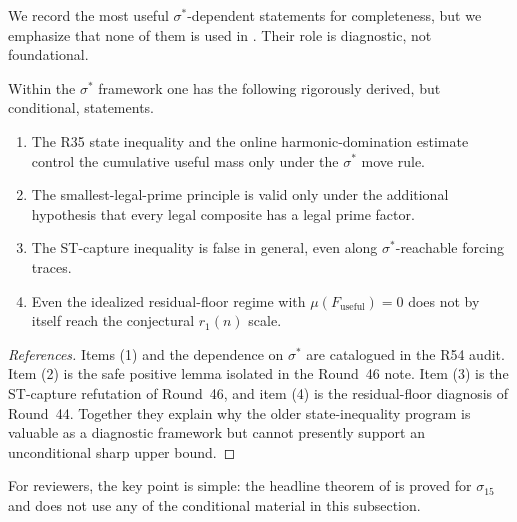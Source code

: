 We record the most useful $\sigma^*$-dependent statements for completeness, but
we emphasize that none of them is used in .  Their
role is diagnostic, not foundational.

\begin{proposition}\label{prop:sigma-star-conditional}
Within the $\sigma^*$ framework one has the following rigorously derived, but
conditional, statements.
\begin{enumerate}
  \item The R35 state inequality and the online harmonic-domination estimate
  control the cumulative useful mass only under the $\sigma^*$ move rule.
  \item The smallest-legal-prime principle is valid only under the additional
  hypothesis that every legal composite has a legal prime factor.
  \item The ST-capture inequality is false in general, even along
  $\sigma^*$-reachable forcing traces.
  \item Even the idealized residual-floor regime with $\mu(F_{\mathrm{useful}})
  =0$ does not by itself reach the conjectural $r_1(n)$ scale.
\end{enumerate}
\end{proposition}

\begin{proof}[References]
Items (1) and the dependence on $\sigma^*$ are catalogued in the R54 audit.
Item (2) is the safe positive lemma isolated in the Round~46 note.  Item (3) is
the ST-capture refutation of Round~46, and item (4) is the residual-floor
diagnosis of Round~44.  Together they explain why the older state-inequality
program is valuable as a diagnostic framework but cannot presently support an
unconditional sharp upper bound.
\end{proof}

\begin{remark}
For reviewers, the key point is simple: the headline theorem of
 is proved for $\sigma_{15}$ and does not use any of
the conditional material in this subsection.
\end{remark}
